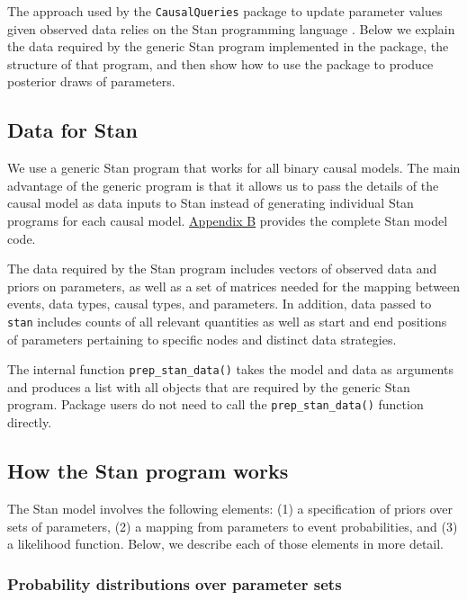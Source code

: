 \documentclass[
  11pt,
  article]{jss}
\begin{document}
The approach used by the \texttt{CausalQueries} package to update
parameter values given observed data relies on the Stan programming
language \citep{carpenter_stan_2017}. Below we explain the data required
by the generic Stan program implemented in the package, the structure of
that program, and then show how to use the package to produce posterior
draws of parameters.

\subsection{Data for Stan}\label{data-for-stan}

We use a generic Stan program that works for all binary causal models.
The main advantage of the generic program is that it allows us to pass
the details of the causal model as data inputs to Stan instead of
generating individual Stan programs for each causal model.
\hyperref[sec-stancode]{Appendix B} provides the complete Stan model
code.

The data required by the Stan program includes vectors of observed data
and priors on parameters, as well as a set of matrices needed for the
mapping between events, data types, causal types, and parameters. In
addition, data passed to \texttt{stan} includes counts of all relevant
quantities as well as start and end positions of parameters pertaining
to specific nodes and distinct data strategies.

The internal function \texttt{prep\_stan\_data()} takes the model and
data as arguments and produces a list with all objects that are required
by the generic Stan program. Package users do not need to call the
\texttt{prep\_stan\_data()} function directly.

\subsection{How the Stan program
works}\label{how-the-stan-program-works}

The Stan model involves the following elements: (1) a specification of
priors over sets of parameters, (2) a mapping from parameters to event
probabilities, and (3) a likelihood function. Below, we describe each of
those elements in more detail.

\subsubsection{Probability distributions over parameter
sets}\label{probability-distributions-over-parameter-sets}
\end{document}
